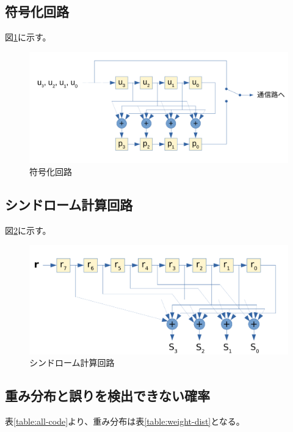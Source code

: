 \documentclass[a4paper,11pt]{jsarticle}
\begin{document}
\subsection{符号化回路}
図\ref{fig:encoding-circuit}に示す。

\begin{figure}[htbp]
  \begin{center}
  \includegraphics[scale=0.7]{figures/circuit001.pdf}
  \end{center}
  \caption{符号化回路
  \label{fig:encoding-circuit}
  }
\end{figure}

\subsection{シンドローム計算回路}
図\ref{fig:calc-syndrome}に示す。

\begin{figure}[htbp]
  \begin{center}
  \includegraphics[scale=0.7]{figures/calc_syndrome001.pdf}
  \end{center}
  \caption{シンドローム計算回路
  \label{fig:calc-syndrome}
  }
\end{figure}

\subsection{重み分布と誤りを検出できない確率}
表\ref{table:all-code}より、重み分布は表\ref{table:weight-dist}となる。
\end{document}
